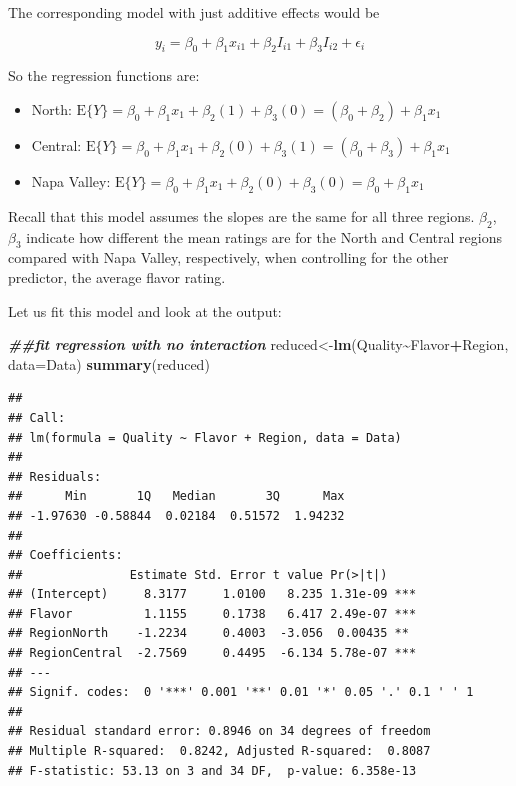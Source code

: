 \documentclass[
]{book}
\newenvironment{Shaded}{\begin{snugshade}}{\end{snugshade}}
\newcommand{\AttributeTok}[1]{\textcolor[rgb]{0.13,0.29,0.53}{#1}}
\newcommand{\DocumentationTok}[1]{\textcolor[rgb]{0.56,0.35,0.01}{\textbf{\textit{#1}}}}
\newcommand{\FunctionTok}[1]{\textcolor[rgb]{0.13,0.29,0.53}{\textbf{#1}}}
\newcommand{\NormalTok}[1]{#1}
\newcommand{\OtherTok}[1]{\textcolor[rgb]{0.56,0.35,0.01}{#1}}
\newcommand{\SpecialCharTok}[1]{\textcolor[rgb]{0.81,0.36,0.00}{\textbf{#1}}}
\begin{document}
The corresponding model with just additive effects would be

\begin{equation*}
y_i = \beta_0 + \beta_1x_{i1} + \beta_2I_{i1} + \beta_3I_{i2} +  \epsilon_i
\end{equation*}

So the regression functions are:

\begin{itemize}
\item
  North: \(\mbox{E}\{Y\} = \beta_0 + \beta_1x_1 + \beta_2(1) + \beta_3(0) = (\beta_0+\beta_2) + \beta_1x_1\)
\item
  Central: \(\mbox{E}\{Y\} = \beta_0 + \beta_1x_1 + \beta_2(0) + \beta_3(1) = (\beta_0+\beta_3) + \beta_1x_1\)
\item
  Napa Valley: \(\mbox{E}\{Y\} = \beta_0 + \beta_1x_1 + \beta_2(0) + \beta_3(0) = \beta_0 + \beta_1x_1\)
\end{itemize}

Recall that this model assumes the slopes are the same for all three regions. \(\beta_{2}\), \(\beta_{3}\) indicate how different the mean ratings are for the North and Central regions compared with Napa Valley, respectively, when controlling for the other predictor, the average flavor rating.

Let us fit this model and look at the output:

\begin{Shaded}
\begin{Highlighting}[]
\DocumentationTok{\#\#fit regression with no interaction}
\NormalTok{reduced}\OtherTok{\textless{}{-}}\FunctionTok{lm}\NormalTok{(Quality}\SpecialCharTok{\textasciitilde{}}\NormalTok{Flavor}\SpecialCharTok{+}\NormalTok{Region, }\AttributeTok{data=}\NormalTok{Data)}
\FunctionTok{summary}\NormalTok{(reduced)}
\end{Highlighting}
\end{Shaded}

\begin{verbatim}
## 
## Call:
## lm(formula = Quality ~ Flavor + Region, data = Data)
## 
## Residuals:
##      Min       1Q   Median       3Q      Max 
## -1.97630 -0.58844  0.02184  0.51572  1.94232 
## 
## Coefficients:
##               Estimate Std. Error t value Pr(>|t|)    
## (Intercept)     8.3177     1.0100   8.235 1.31e-09 ***
## Flavor          1.1155     0.1738   6.417 2.49e-07 ***
## RegionNorth    -1.2234     0.4003  -3.056  0.00435 ** 
## RegionCentral  -2.7569     0.4495  -6.134 5.78e-07 ***
## ---
## Signif. codes:  0 '***' 0.001 '**' 0.01 '*' 0.05 '.' 0.1 ' ' 1
## 
## Residual standard error: 0.8946 on 34 degrees of freedom
## Multiple R-squared:  0.8242, Adjusted R-squared:  0.8087 
## F-statistic: 53.13 on 3 and 34 DF,  p-value: 6.358e-13
\end{verbatim}
\end{document}

